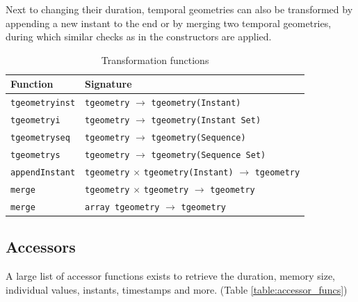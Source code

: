 Next to changing their duration, temporal geometries can also be transformed by appending a new instant to the end or by merging two temporal geometries, during which similar checks as in the constructors are applied.

\begin{table}[htb]
    \centering
    \begin{tabularx}{\textwidth}{|l|X|}
    \hline
    \textbf{Function}   & \textbf{Signature} \\ 
    \hline
    \lstinline+tgeometryinst+       & \lstinline+tgeometry+ $\rightarrow$ \lstinline+tgeometry(Instant)+ \\
    \hline
    \lstinline+tgeometryi+          & \lstinline+tgeometry+ $\rightarrow$ \lstinline+tgeometry(Instant Set)+ \\
    \hline
    \lstinline+tgeometryseq+        & \lstinline+tgeometry+ $\rightarrow$ \lstinline+tgeometry(Sequence)+ \\
    \hline
    \lstinline+tgeometrys+          & \lstinline+tgeometry+ $\rightarrow$ \lstinline+tgeometry(Sequence Set)+ \\
    \hline
    \hline
    \lstinline+appendInstant+       & \lstinline+tgeometry+ $\times$ \lstinline+tgeometry(Instant)+ $\rightarrow$ \lstinline+tgeometry+ \\
    \hline
    \lstinline+merge+               & \lstinline+tgeometry+ $\times$ \lstinline+tgeometry+ $\rightarrow$ \lstinline+tgeometry+ \\
    \hline
    \lstinline+merge+               & \lstinline+array tgeometry+ $\rightarrow$ \lstinline+tgeometry+ \\
    \hline
    \end{tabularx}
    \caption{Transformation functions}
    \label{table:transformation_funcs}
\end{table}

\subsection{Accessors}
\label{section:accessors}

A large list of accessor functions exists to retrieve the duration, memory size, individual values, instants, timestamps and more. (Table \ref{table:accessor_funcs})

